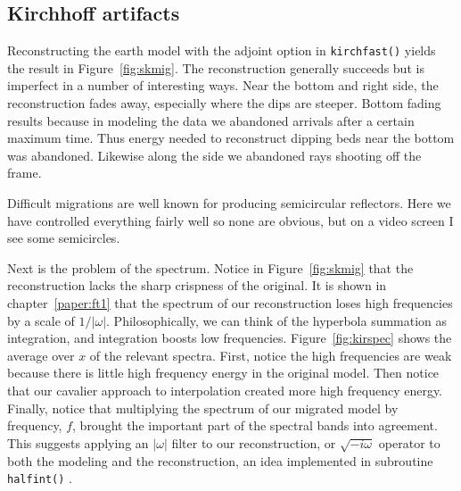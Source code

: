 \subsection{Kirchhoff artifacts}
Reconstructing the earth model with the adjoint option in \texttt{kirchfast()} 
yields the result in Figure~\ref{fig:skmig}. %
%
The reconstruction generally succeeds
but is imperfect in a number of interesting ways.
Near the bottom and right side, the reconstruction fades away,
especially where the dips are steeper.
Bottom fading results because in modeling the data
we abandoned arrivals after a certain maximum time.
Thus energy needed to reconstruct dipping beds near the bottom
was abandoned.
Likewise along the side we abandoned rays shooting off the frame.

\par
Difficult migrations are well known for producing semicircular reflectors.
Here we have controlled everything fairly well so none are obvious,
but on a video screen I see some semicircles.

\par
Next is the problem of the spectrum.
Notice in Figure~\ref{fig:skmig} that the reconstruction
lacks the sharp crispness of the original.
It is shown in chapter~\ref{paper:ft1}
that the spectrum of our reconstruction
loses high frequencies by a scale of $1/ | \omega |$.
Philosophically, we can think of the hyperbola summation
as integration, and integration boosts low frequencies.
Figure~\ref{fig:kirspec} shows the average over $x$
of the relevant spectra. %
First, notice the high frequencies are weak because
there is little high frequency energy in the original model.
Then notice that our cavalier approach to interpolation
created more high frequency energy.
Finally, notice that multiplying the spectrum of our
migrated model by frequency, $f$, brought the important
part of the spectral bands into agreement.
This suggests applying an $|\omega |$ filter to our reconstruction,
or $\sqrt{-i\omega}$ operator to both the modeling and the reconstruction,
an idea implemented in subroutine \texttt{halfint()} .

